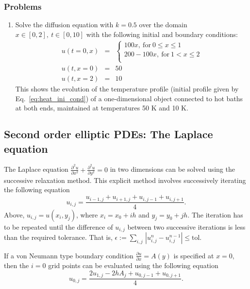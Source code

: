 \subsubsection{Problems}
\begin{enumerate}
\item Solve the diffusion equation with $k = 0.5$ over the domain $x \in [0, 2],~t \in [0, 10]$ with the following initial and boundary conditions: 
\begin{eqnarray}
\label{eq:heat_ini_cond}
u (t=0, x) & = & 
\begin{cases}
100 x,~\mathrm{for}~ 0 \leq x \leq 1 \\
200-100 x,~\mathrm{for}~ 1 < x \leq 2 \\
\end{cases}\\
u(t, x=0) & = & 50 \\
u(t, x=2) & = & 10 
\end{eqnarray}
This shows the evolution of the temperature profile (initial profile given by Eq.~\ref{eq:heat_ini_cond}) of a one-dimensional object connected to hot baths at both ends, maintained at temperatures 50 K and 10 K. 
\end{enumerate}

\subsection{Second order elliptic PDEs: The Laplace equation}

The Laplace equation $\frac{\partial^2 u}{\partial x^2} + \frac{\partial^2 u}{\partial y^2} = 0$ in two dimensions can be solved using the successive relaxation method. This explicit method involves successively iterating the following equation 
\begin{equation}
u_{i,j} = \frac{u_{i-1,j} + u_{i+1,j} + u_{i,j-1} + u_{i,j+1}}{4}.
\end{equation}
Above, $u_{i,j} = u(x_i, y_j)$, where $x_i = x_0 + i h$ and $y_j = y_0 + j h$. The iteration has to be repeated until the difference of $u_{i,j}$ between two successive iterations is less than the required tolerance. That is, $\epsilon := \sum_{i,j} \, |u_{i,j}^{n} - u_{i,j}^{n-1}| \leq \mathrm{tol}$.

If a von Neumann type boundary condition $\frac{\partial u}{\partial x} = A(y)$ is specified at $x = 0$, then the $i=0$ grid points can be evaluated using the following equation  
\begin{equation}
u_{0,j} = \frac{2 u_{1,j} - 2 h A_j + u_{0,j-1} + u_{0,j+1}}{4}.
\end{equation}

